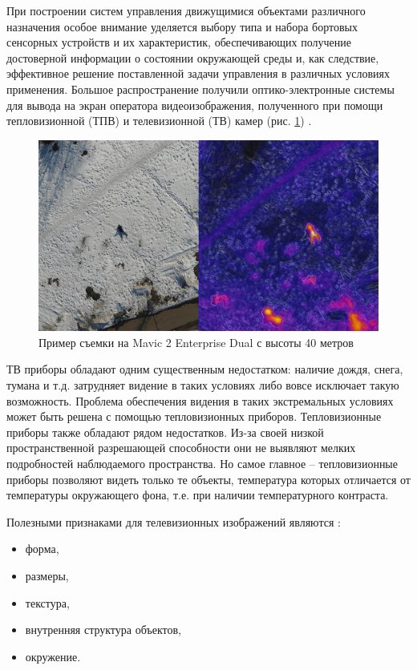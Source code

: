 При построении систем управления движущимися объектами различного назначения особое внимание уделяется выбору типа и набора бортовых сенсорных устройств и их характеристик, обеспечивающих получение достоверной информации о состоянии окружающей среды и, как следствие, эффективное решение поставленной задачи управления в различных условиях применения. Большое распространение получили оптико-электронные системы для вывода на экран оператора видеоизображения, полученного при помощи тепловизионной (ТПВ) и телевизионной (ТВ) камер (рис. \ref{teplovision}) .
\begin{figure}[ht!]
    \centering
    \includegraphics[width=0.8\linewidth]{my_folder/images/teplovision.jpeg}
    \caption{Пример съемки на Mavic 2 Enterprise Dual с высоты 40 метров}
    \label{teplovision}
\end{figure}

ТВ приборы обладают одним существенным недостатком: наличие дождя, снега, тумана и т.д. затрудняет видение в таких условиях либо вовсе исключает такую возможность. Проблема обеспечения видения в таких экстремальных условиях может быть решена с помощью тепловизионных приборов. Тепловизионные приборы также обладают рядом недостатков. Из-за своей низкой пространственной разрешающей способности они не выявляют мелких подробностей наблюдаемого пространства. Но самое главное – тепловизионные приборы позволяют видеть только те объекты, температура которых отличается от температуры окружающего фона, т.е. при наличии температурного контраста.

Полезными признаками для телевизионных изображений являются \cite{optical-prisnaki}:
\begin{itemize}
    \item форма,
    \item размеры,
    \item текстура,
    \item внутренняя структура объектов,
    \item окружение.
\end{itemize}

